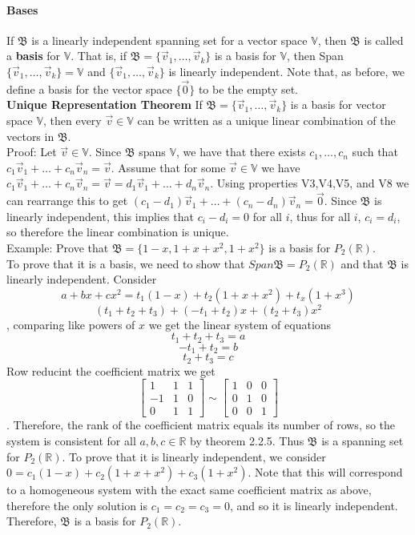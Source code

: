 \documentclass[10pt,letter]{article}
\begin{document}
\paragraph{Bases} If $\mathfrak{B}$ is a linearly independent spanning set for a vector space $\mathbb{V}$, then $\mathfrak{B}$ is called a \textbf{basis} for $\mathbb{V}$. That is, if $\mathfrak{B}=\{\vec{v}_1,\ldots,\vec{v}_k\}$ is a basis for $\mathbb{V}$, then Span$\{\vec{v}_1,\ldots,\vec{v}_k\}=\mathbb{V}$ and $\{\vec{v}_1,\ldots,\vec{v}_k\}$ is linearly independent. Note that, as before, we define a basis for the vector space $\{\vec{0}\}$ to be the empty set. \\ 
\textbf{Unique Representation Theorem} If $\mathfrak{B}=\{\vec{v}_1,\ldots,\vec{v}_k\}$ is a basis for vector space $\mathbb{V}$, then every $\vec{v}\in\mathbb{V}$ can be written as a unique linear combination of the vectors in $\mathfrak{B}$. \\ 
Proof: Let $\vec{v}\in\mathbb{V}$. Since $\mathfrak{B}$ spans $\mathbb{V}$, we have that there exists $c_1,\ldots,c_n$ such that $c_1\vec{v}_1+\ldots+c_n\vec{v}_n=\vec{v}$. Assume that for some $\vec{v}\in\mathbb{V}$ we have $c_1\vec{v}_1+\ldots+c_n\vec{v}_n=\vec{v}=d_1\vec{v}_1+\ldots+d_n\vec{v}_n$. Using properties V3,V4,V5, and V8 we can rearrange this to get $(c_1-d_1)\vec{v}_1+\ldots+(c_n-d_n)\vec{v}_n=\vec{0}$. Since $\mathfrak{B}$ is linearly independent, this implies that $c_i-d_i=0$ for all $i$, thus for all $i$, $c_i=d_i$, so therefore the linear combination is unique. \\ 
Example: Prove that $\mathfrak{B}=\{1-x,1+x+x^2,1+x^2\}$ is a basis for $P_2(\mathbb{R})$. \\ 
To prove that it is a basis, we need to show that $Span\mathfrak{B}=P_2(\mathbb{R})$ and that $\mathfrak{B}$ is linearly independent. Consider $$a+bx+cx^2=t_1(1-x)+t_2(1+x+x^2)+t_x(1+x^3)$$ $$(t_1+t_2+t_3)+(-t_1+t_2)x+(t_2+t_3)x^2$$, comparing like powers of $x$ we get the linear system of equations $$t_1+t_2+t_3=a$$ $$-t_1+t_2=b$$ $$t_2+t_3=c$$ Row reducint the coefficient matrix we get $$\begin{bmatrix}1&1&1\\-1&1&0\\0&1&1\end{bmatrix}\sim\begin{bmatrix}1&0&0\\0&1&0\\0&0&1\end{bmatrix}$$. Therefore, the rank of the coefficient matrix equals its number of rows, so the system is consistent for all $a,b,c\in\mathbb{R}$ by theorem 2.2.5. Thus $\mathfrak{B}$ is a spanning set for $P_2(\mathbb{R})$. To prove that it is linearly independent, we consider $0=c_1(1-x)+c_2(1+x+x^2)+c_3(1+x^2)$. Note that this will correspond to a homogeneous system with the exact same coefficient matrix as above, therefore the only solution is $c_1=c_2=c_3=0$, and so it is linearly independent. Therefore, $\mathfrak{B}$ is a basis for $P_2(\mathbb{R})$. \\ 
\end{document}
